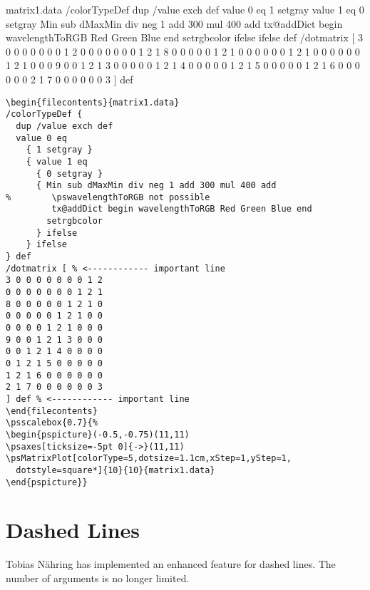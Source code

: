 \documentclass[11pt,english,BCOR10mm,DIV12,bibliography=totoc,parskip=false,smallheadings
    headexclude,footexclude,oneside]{pst-doc}
\begin{document}
\begin{center}
\begin{filecontents}{matrix1.data}
/colorTypeDef {
  dup /value exch def 
  value 0 eq 
    { 1 setgray }
    { value 1 eq 
      { 0 setgray }
      { Min sub dMaxMin div neg 1 add 300 mul 400 add
         tx@addDict begin wavelengthToRGB Red Green Blue end 
        setrgbcolor
      } ifelse
    } ifelse 
} def
/dotmatrix [ %
3 0 0 0 0 0 0 0 1 2
0 0 0 0 0 0 0 1 2 1
8 0 0 0 0 0 1 2 1 0
0 0 0 0 0 1 2 1 0 0
0 0 0 0 1 2 1 0 0 0
9 0 0 1 2 1 3 0 0 0
0 0 1 2 1 4 0 0 0 0
0 1 2 1 5 0 0 0 0 0
1 2 1 6 0 0 0 0 0 0
2 1 7 0 0 0 0 0 0 3
] def %
\end{filecontents}
\end{center}

\begin{lstlisting}
\begin{filecontents}{matrix1.data}
/colorTypeDef {
  dup /value exch def 
  value 0 eq 
    { 1 setgray }
    { value 1 eq 
      { 0 setgray }
      { Min sub dMaxMin div neg 1 add 300 mul 400 add
%        \pswavelengthToRGB not possible
         tx@addDict begin wavelengthToRGB Red Green Blue end 
        setrgbcolor
      } ifelse
    } ifelse 
} def
/dotmatrix [ % <------------ important line
3 0 0 0 0 0 0 0 1 2
0 0 0 0 0 0 0 1 2 1
8 0 0 0 0 0 1 2 1 0
0 0 0 0 0 1 2 1 0 0
0 0 0 0 1 2 1 0 0 0
9 0 0 1 2 1 3 0 0 0
0 0 1 2 1 4 0 0 0 0
0 1 2 1 5 0 0 0 0 0
1 2 1 6 0 0 0 0 0 0
2 1 7 0 0 0 0 0 0 3
] def % <------------ important line
\end{filecontents}
\psscalebox{0.7}{%
\begin{pspicture}(-0.5,-0.75)(11,11)
\psaxes[ticksize=-5pt 0]{->}(11,11)
\psMatrixPlot[colorType=5,dotsize=1.1cm,xStep=1,yStep=1,
  dotstyle=square*]{10}{10}{matrix1.data}
\end{pspicture}}
\end{lstlisting}



\section{Dashed Lines}
Tobias Nähring has implemented an enhanced feature for dashed
lines. The number of arguments is no longer limited.
\end{document}
